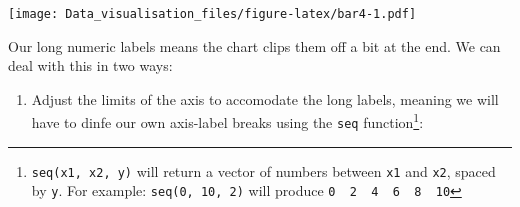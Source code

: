 \documentclass[]{book}
\newenvironment{Shaded}{\begin{snugshade}}{\end{snugshade}}
\newcommand{\DataTypeTok}[1]{\textcolor[rgb]{0.13,0.29,0.53}{#1}}
\newcommand{\DecValTok}[1]{\textcolor[rgb]{0.00,0.00,0.81}{#1}}
\newcommand{\FloatTok}[1]{\textcolor[rgb]{0.00,0.00,0.81}{#1}}
\newcommand{\KeywordTok}[1]{\textcolor[rgb]{0.13,0.29,0.53}{\textbf{#1}}}
\newcommand{\NormalTok}[1]{#1}
\newcommand{\OperatorTok}[1]{\textcolor[rgb]{0.81,0.36,0.00}{\textbf{#1}}}
\newcommand{\OtherTok}[1]{\textcolor[rgb]{0.56,0.35,0.01}{#1}}
\newcommand{\StringTok}[1]{\textcolor[rgb]{0.31,0.60,0.02}{#1}}
\providecommand{\tightlist}{%
  \setlength{\itemsep}{0pt}\setlength{\parskip}{0pt}}
\let\rmarkdownfootnote\footnote%
\def\footnote{\protect\rmarkdownfootnote}
\begin{document}
\texttt{[image: Data\_visualisation\_files/figure-latex/bar4-1.pdf]}

Our long numeric labels means the chart clips them off a bit at the end. We can deal with this in two ways:

\begin{enumerate}
\def\labelenumi{\arabic{enumi}.}
\tightlist
\item
  Adjust the limits of the axis to accomodate the long labels, meaning we will have to dinfe our own axis-label breaks using the \texttt{seq} function\footnote{\texttt{seq(x1,\ x2,\ y)} will return a vector of numbers between \texttt{x1} and \texttt{x2}, spaced by \texttt{y}. For example: \texttt{seq(0,\ 10,\ 2)} will produce \texttt{0\ \ 2\ \ 4\ \ 6\ \ 8\ \ 10}}:
\end{enumerate}

\begin{Shaded}
\end{Shaded}
\end{document}
